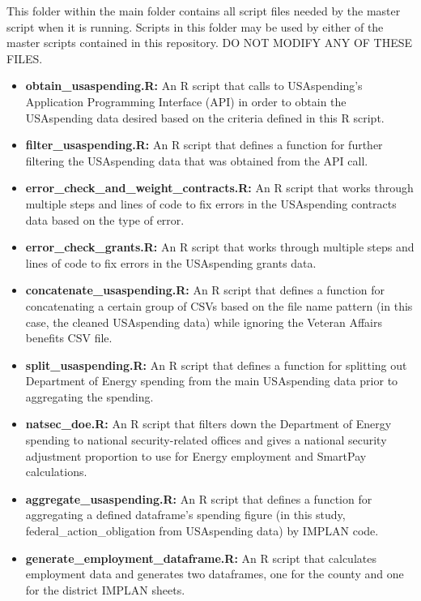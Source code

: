 \documentclass[
]{book}
\providecommand{\tightlist}{%
  \setlength{\itemsep}{0pt}\setlength{\parskip}{0pt}}
\begin{document}
This folder within the main folder contains all script files needed by the master script when it is running. Scripts in this folder may be used by either of the master scripts contained in this repository. DO NOT MODIFY ANY OF THESE FILES.

\begin{itemize}
\tightlist
\item
  \textbf{obtain\_usaspending.R:} An R script that calls to USAspending's Application Programming Interface (API) in order to obtain the USAspending data desired based on the criteria defined in this R script.
\item
  \textbf{filter\_usaspending.R:} An R script that defines a function for further filtering the USAspending data that was obtained from the API call.
\item
  \textbf{error\_check\_and\_weight\_contracts.R:} An R script that works through multiple steps and lines of code to fix errors in the USAspending contracts data based on the type of error.
\item
  \textbf{error\_check\_grants.R:} An R script that works through multiple steps and lines of code to fix errors in the USAspending grants data.
\item
  \textbf{concatenate\_usaspending.R:} An R script that defines a function for concatenating a certain group of CSVs based on the file name pattern (in this case, the cleaned USAspending data) while ignoring the Veteran Affairs benefits CSV file.
\item
  \textbf{split\_usaspending.R:} An R script that defines a function for splitting out Department of Energy spending from the main USAspending data prior to aggregating the spending.
\item
  \textbf{natsec\_doe.R:} An R script that filters down the Department of Energy spending to national security-related offices and gives a national security adjustment proportion to use for Energy employment and SmartPay calculations.
\item
  \textbf{aggregate\_usaspending.R:} An R script that defines a function for aggregating a defined dataframe's spending figure (in this study, federal\_action\_obligation from USAspending data) by IMPLAN code.
\item
  \textbf{generate\_employment\_dataframe.R:} An R script that calculates employment data and generates two dataframes, one for the county and one for the district IMPLAN sheets.
\end{itemize}
\end{document}
